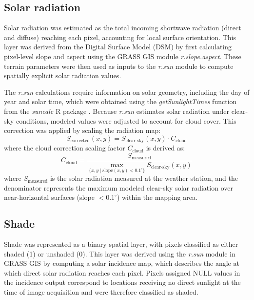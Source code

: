 \documentclass[12pt]{article}
\begin{document}
\subsection{Solar radiation}
\noindent
Solar radiation was estimated as the total incoming shortwave radiation (direct and diffuse) reaching each pixel, accounting for local surface orientation. This layer was derived from the Digital Surface Model (DSM) by first calculating pixel-level slope and aspect using the GRASS GIS module \textit{r.slope.aspect}. These terrain parameters were then used as inputs to the \textit{r.sun} module to compute spatially explicit solar radiation values.

The \textit{r.sun} calculations require information on solar geometry, including the day of year and solar time, which were obtained using the \textit{getSunlightTimes} function from the \textit{suncalc} R package \citep{Thieurmel_2022}. Because \textit{r.sun} estimates solar radiation under clear-sky conditions, modeled values were adjusted to account for cloud cover. This correction was applied by scaling the radiation map:
\begin{equation}
S_{\text{corrected}}(x, y) = S_{\text{clear-sky}}(x, y) \cdot C_{\text{cloud}}
\end{equation}
where the cloud correction scaling factor $C_{\text{cloud}}$ is derived as:
\begin{equation}
C_{\text{cloud}} = \frac{S_{\text{measured}}}{\max_{\{x, y \mid \text{slope}(x, y) < 0.1^{\circ}\}} S_{\text{clear-sky}}(x, y)}
\end{equation}
where $S_{\text{measured}}$ is the solar radiation measured at the weather station, and the denominator represents the maximum modeled clear-sky solar radiation over near-horizontal surfaces (slope $< 0.1^{\circ}$) within the mapping area.

\subsection{Shade}
\noindent
Shade was represented as a binary spatial layer, with pixels classified as either shaded (1) or unshaded (0). This layer was derived using the \textit{r.sun} module in GRASS GIS by computing a solar incidence map, which describes the angle at which direct solar radiation reaches each pixel. Pixels assigned NULL values in the incidence output correspond to locations receiving no direct sunlight at the time of image acquisition and were therefore classified as shaded.
\end{document}
